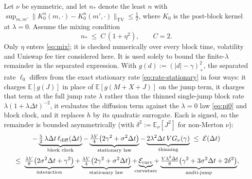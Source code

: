 \documentclass[runningheads]{llncs}
\newcommand{\E}{\mathbb{E}}
\newcommand{\dt}{\Delta t}
\newcommand{\1}{\mathbf{1}}
\begin{document}
\begin{proposition}\label{prop:error}
Let $\nu$ be symmetric, and let $n_*$ denote the least $n$ with $\sup_{m,m'}\|K_0^{n}(m,\cdot)-K_0^{n}(m',\cdot)\|_{\mathrm{TV}}\le\tfrac12$, where $K_0$ is the post-block kernel at $\lambda=0$. Assume the mixing condition
\begin{equation}\label{eq:mix}
n_* \;\le\; C\,(1+\eta^2), \qquad C=2.
\end{equation}
Only $\eta$ enters \eqref{eq:mix}; it is checked numerically over every block time, volatility and Uniswap fee tier considered here. It is used solely to bound the finite-$\lambda$ remainder in the separated expression. With $g(d):=(|d|-\gamma)_+^2$, the separated rate $\ell_0$ differs from the exact stationary rate \eqref{eq:rate-stationary} in four ways: it charges $\E[g(J)]$ in place of $\E[g(M+X+J)]$ on the jump term, it charges that term at the full jump rate $\lambda$ rather than the thinned single-jump block rate $\lambda(1+\lambda\dt)^{-2}$, it evaluates the diffusion term against the $\lambda=0$ law \eqref{eq:pi0} and block clock, and it replaces $h$ by its quadratic surrogate. Each is signed, so the remainder is bounded asymmetrically (with $\delta^2 := \E_\nu[J^2]$ for non-Merton $\nu$):
\begin{multline*}
-\underbrace{\tfrac52\,\lambda\dt\,\ell_{\mathrm{diff}}(\dt)}_{\text{block clock}} - \underbrace{\tfrac{\lambda V}{4}\big(2\gamma^2+\sigma^2\dt\big)}_{\text{stationary law}} - \underbrace{2\lambda^2\dt\,V G_\nu(\gamma)}_{\text{thinning}}
\;\le\; \mathcal{E}(\dt)\\
\;\le\;
\underbrace{\tfrac{\lambda V}{8}\big(2\sigma^2\dt + \gamma^2\big)}_{\text{interaction}}
+ \underbrace{\tfrac{\lambda V}{4}\big(2\gamma^2+\sigma^2\dt\big)}_{\mathclap{\text{stationary law}}} + \underbrace{\mathcal{E}_{\mathrm{curv}}}_{\mathclap{\text{curvature}}} + \underbrace{\tfrac{V\lambda^2\dt}{8}\big(\gamma^2+3\sigma^2\dt+2\delta^2\big)}_{\mathclap{\text{multi-jump}}},
\end{multline*}

\end{proposition}
\end{document}
